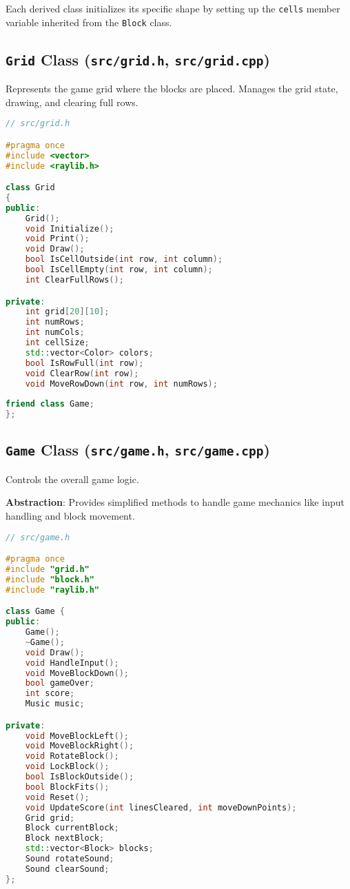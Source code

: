 \documentclass{article}
\begin{document}
Each derived class initializes its specific shape by setting up the \texttt{cells} member variable inherited from the \texttt{Block} class.

\subsection{\texttt{Grid} Class (\texttt{src/grid.h}, \texttt{src/grid.cpp})}

Represents the game grid where the blocks are placed. Manages the grid state, drawing, and clearing full rows.

\begin{lstlisting}[language=C++]
// src/grid.h

#pragma once
#include <vector>
#include <raylib.h>

class Grid
{
public:
    Grid();
    void Initialize();
    void Print();
    void Draw();
    bool IsCellOutside(int row, int column);
    bool IsCellEmpty(int row, int column);
    int ClearFullRows();

private:
    int grid[20][10];
    int numRows;
    int numCols;
    int cellSize;
    std::vector<Color> colors;
    bool IsRowFull(int row);
    void ClearRow(int row);
    void MoveRowDown(int row, int numRows);
    
friend class Game;
};
\end{lstlisting}

\subsection{\texttt{Game} Class (\texttt{src/game.h}, \texttt{src/game.cpp})}

Controls the overall game logic.

\textbf{Abstraction}: Provides simplified methods to handle game mechanics like input handling and block movement.

\begin{lstlisting}[language=C++]
// src/game.h

#pragma once
#include "grid.h"
#include "block.h"
#include "raylib.h"

class Game {
public:
    Game();
    ~Game();
    void Draw();
    void HandleInput();
    void MoveBlockDown();
    bool gameOver;
    int score;
    Music music;

private:
    void MoveBlockLeft();
    void MoveBlockRight();
    void RotateBlock();
    void LockBlock();
    bool IsBlockOutside();
    bool BlockFits();
    void Reset();
    void UpdateScore(int linesCleared, int moveDownPoints);
    Grid grid;
    Block currentBlock;
    Block nextBlock;
    std::vector<Block> blocks;
    Sound rotateSound;
    Sound clearSound;
};
\end{lstlisting}
\end{document}
